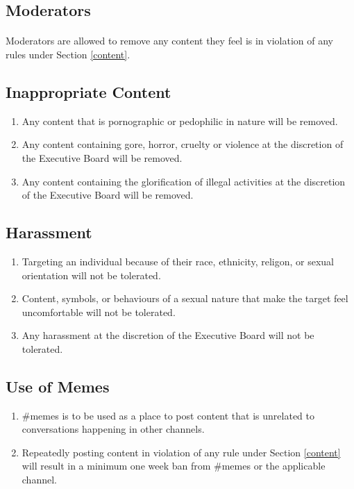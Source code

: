 \documentclass[10pt,a4paper]{article}
\begin{document}
\subsection{Moderators}
\paragraph{}
Moderators are allowed to remove any content they feel is in violation of any rules under Section \ref{content}.
\subsection{Inappropriate Content}
\begin{enumerate}
	\item Any content that is pornographic or pedophilic in nature will be removed.
	\item Any content containing gore, horror, cruelty or violence at the discretion of the Executive Board will be removed.
	\item Any content containing the glorification of illegal activities at the discretion of the Executive Board will be removed.
\end{enumerate}
\subsection{Harassment}
\begin{enumerate}
	\item Targeting an individual because of their race, ethnicity, religon, or sexual orientation will not be tolerated.
	\item Content, symbols, or behaviours of a sexual nature that make the target feel uncomfortable will not be tolerated.
	\item Any harassment at the discretion of the Executive Board will not be tolerated.
\end{enumerate}
\subsection{Use of Memes}
\begin{enumerate}
	\item \#memes is to be used as a place to post content that is unrelated to conversations happening in other channels.
	\item Repeatedly posting content in violation of any rule under Section \ref{content} will result in a minimum one week ban from \#memes or the applicable channel.
\end{enumerate}
\end{document}
